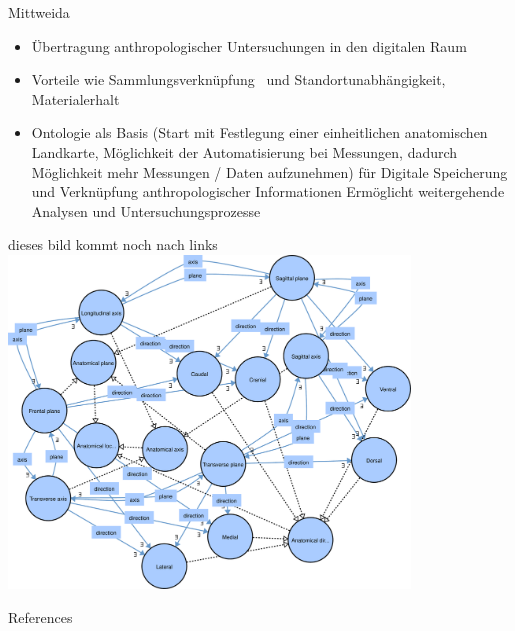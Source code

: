 \documentclass[portrait,final,a0paper,fontscale=0.320]{imiseposter}
\begin{document}
\begin{poster}
\begin{posterbox}[name=results,column=1]{Mittweida}
\begin{itemize}
\item Übertragung anthropologischer Untersuchungen in den digitalen Raum~\cite{digitalisierung}
\item Vorteile wie Sammlungsverknüpfung~\cite{spurensuche} und Standortunabhängigkeit, Materialerhalt 
\item Ontologie als Basis (Start mit Festlegung einer einheitlichen anatomischen Landkarte, Möglichkeit der Automatisierung bei Messungen, dadurch Möglichkeit mehr Messungen / Daten aufzunehmen) für Digitale Speicherung und Verknüpfung anthropologischer Informationen 
Ermöglicht weitergehende Analysen und Untersuchungsprozesse 
\end{itemize}
dieses bild kommt noch nach links\\
\includegraphics[width=0.8\textwidth]{img/location.pdf}
\end{posterbox}
\begin{posterbox}[name=references,column=0,below=ontology]{References}
    \small
    \begingroup
    \renewcommand{\section}[2]{}%
    
    

\end{posterbox}
\end{poster}
\end{document}
